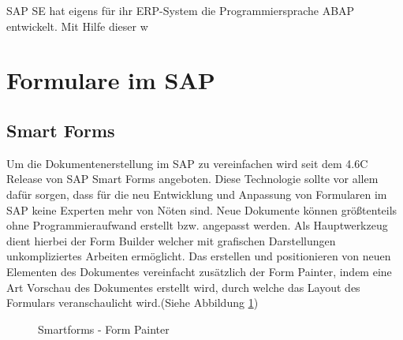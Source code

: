 SAP SE hat eigens für ihr \ac{ERP}-System die Programmiersprache \ac{ABAP} entwickelt. Mit Hilfe dieser w



\section{Formulare im SAP}

\subsection{Smart Forms}

Um die Dokumentenerstellung im SAP zu vereinfachen wird seit dem 4.6C Release von SAP Smart Forms angeboten. Diese Technologie sollte vor allem dafür sorgen, dass für die neu Entwicklung und Anpassung von Formularen im SAP keine Experten mehr von Nöten sind. Neue Dokumente können größtenteils ohne Programmieraufwand erstellt bzw. angepasst werden. Als Hauptwerkzeug dient hierbei der Form Builder welcher mit grafischen Darstellungen unkompliziertes Arbeiten ermöglicht. Das erstellen und positionieren von neuen Elementen des Dokumentes vereinfacht zusätzlich der Form Painter, indem eine Art Vorschau des Dokumentes erstellt wird, durch welche das Layout des Formulars veranschaulicht wird.(Siehe Abbildung \ref{fig2}) 

\begin{figure}[!h]
	\centering
	
	\caption{Smartforms - Form Painter}
	\label{fig2}
	
\end{figure}   


